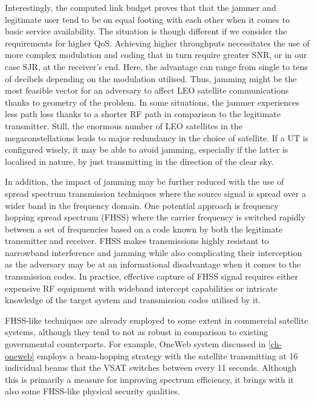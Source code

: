 \documentclass[english, 12pt, a4paper, elec, utf8, a-1b, online]{aaltothesis}
\begin{document}
Interestingly, the computed link budget proves that that the jammer and legitimate user tend to be on equal footing with each other when it comes to basic service availability. The situation is though different if we consider the requirements for higher QoS.
Achieving higher throughputs necessitates the use of more complex modulation and coding that in turn require greater SNR, or in our case SJR, at the receiver's end. Here, the advantage can range from single to tens of decibels depending on the modulation utilised.
Thus, jamming might be the most feasible vector for an adversary to affect LEO satellite communications thanks to geometry of the problem.
In some situations, the jammer experiences less path loss thanks to a shorter RF path in comparison to the legitimate transmitter.
Still, the enormous number of LEO satellites in the megaconstellations leads to major redundancy in the choice of satellite.
If a UT is configured wisely, it may be able to avoid jamming, especially if the latter is localised in nature, by just transmitting in the direction of the clear sky.

In addition, the impact of jamming may be further reduced with the use of spread spectrum transmission techniques where the source signal is spread over a wider band in the frequency domain.
One potential approach is frequency hopping spread spectrum (FHSS) where the carrier frequency is switched rapidly between a set of frequencies based on a code known by both the legitimate transmitter and receiver.
FHSS makes transmissions highly resistant to narrowband interference and jamming while also complicating their interception as the adversary may be at an informational disadvantage when it comes to the transmission codes.
In practice, effective capture of FHSS signal requires either expensive RF equipment with wideband intercept capabilities or intricate knowledge of the target system and transmission codes utilised by it.

FHSS-like techniques are already employed to some extent in commercial satellite systems, although they tend to not as robust in comparison to existing governmental counterparts.
For example, OneWeb system discussed in \ref{ch-oneweb} employs a beam-hopping strategy with the satellite transmitting at 16 individual beams that the VSAT switches between every 11 seconds.
Although this is primarily a measure for improving spectrum efficiency, it brings with it also some FHSS-like physical security qualities.

\clearpage
\end{document}
